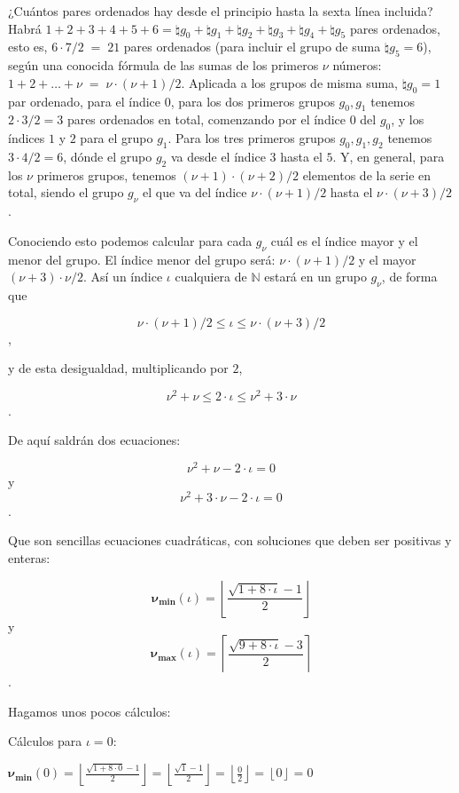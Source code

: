 \documentclass{amsart}
\theoremstyle{definition}
\theoremstyle{remark}
\numberwithin{equation}{section}
\newcommand{\setN}{\mathds N}
\newcommand{\numeral}{\natural}
\newcommand{\monrel}[1]{\mathbf{#1}}
\newcommand{\funct}[1]{\monrel{#1}}
\newcommand{\functat}[2]{\funct{#1}{\left({#2}\right)}}
\begin{document}
	¿Cuántos pares ordenados hay desde el principio hasta la sexta línea
incluida? Habrá $1+2+3+4+5+6 = \numeral g_0 + \numeral g_1 + \numeral g_2 +
\numeral g_3 + \numeral g_4 + \numeral g_5$ pares ordenados, esto es, $6
\cdot 7 / 2 \; = \; 21$ pares ordenados (para incluir el grupo de suma
$\numeral g_5 = 6$), según una conocida fórmula de las sumas de los primeros
$\nu$ números: $1+2+\ldots+\nu \; = \; \nu \cdot (\nu + 1) / 2$. Aplicada a
los grupos de misma suma, $\numeral g_0 = 1$ par ordenado, para el índice
$0$, para los dos primeros grupos $g_0 , g_1$ tenemos $2\cdot 3/ 2 = 3$ pares
ordenados en total, comenzando por el índice $0$ del $g_0$, y los índices $1$
y $2$ para el grupo $g_1$. Para los tres primeros grupos $g_0, g_1, g_2$
tenemos $3\cdot 4 / 2 = 6$, dónde el grupo $g_2$ va desde el índice $3$ hasta
el $5$. Y, en general, para los $\nu$ primeros grupos, tenemos $(\nu + 1)
\cdot (\nu + 2)/2$ elementos de la serie en total, siendo el grupo $g_{\nu}$
el que va del índice $\nu \cdot \left(\nu + 1\right) / 2$ hasta el $\nu \cdot
\left(\nu + 3\right) / 2$.


	Conociendo esto podemos calcular para cada $g_{\nu}$ cuál es el índice
mayor y el menor del grupo. El índice menor del grupo será: $\nu \cdot (\nu +
1) / 2$ y el mayor $(\nu + 3) \cdot \nu / 2$. Así un índice $\iota$
cualquiera de $\setN$ estará en un grupo $g_{\nu}$, de forma que


$$
\nu \cdot (\nu + 1) / 2 \leq \iota \leq \nu \cdot (\nu + 3) / 2
$$,


	y de esta desigualdad, multiplicando por $2$,


$$
{\nu}^2 + {\nu} \leq 2 \cdot \iota \leq {\nu}^2 + 3 \cdot \nu
$$. 


	De aquí saldrán dos ecuaciones:


$$
{\nu}^2 + {\nu} - 2 \cdot \iota = 0
$$ y 
$$
{\nu}^2 + 3 \cdot {\nu} - 2 \cdot \iota = 0
$$.


	Que son sencillas ecuaciones cuadráticas, con soluciones que deben ser
positivas y enteras:


$$
\functat{{\nu}_{\min}}{\iota} =
\left\lfloor\frac{\sqrt{1+8\cdot\iota}-1}{2}\right\rfloor
$$ y 
$$
\functat{{\nu}_{\max}}{\iota} =
\left\lceil\frac{\sqrt{9+8\cdot\iota}-3}{2}\right\rceil
$$.


	Hagamos unos pocos cálculos:


Cálculos para $\iota = 0$:


$\functat{{\nu}_{\min}}{0} =
\left\lfloor\frac{\sqrt{1+8\cdot 0}-1}{2}\right\rfloor =
\left\lfloor\frac{\sqrt{1}-1}{2}\right\rfloor =
\left\lfloor\frac{0}{2}\right\rfloor =
\left\lfloor{0}\right\rfloor = 0
$
\end{document}
